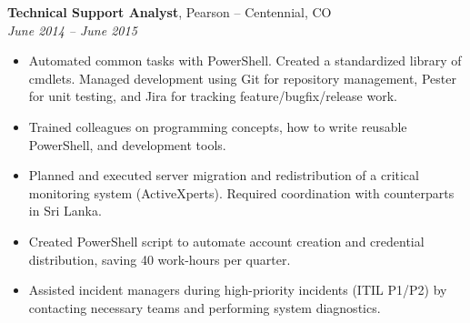 {\bf Technical Support Analyst}, Pearson – Centennial, CO\\
{\it June 2014 – June 2015}
\begin{itemize}
	\item Automated common tasks with PowerShell. Created a standardized library of cmdlets. Managed development using Git for repository management, Pester for unit testing, and Jira for tracking feature/bugfix/release work.
	\item Trained colleagues on programming concepts, how to write reusable PowerShell, and development tools.
	\item Planned and executed server migration and redistribution of a critical monitoring system (ActiveXperts). Required coordination with counterparts in Sri Lanka.
	\item Created PowerShell script to automate account creation and credential distribution, saving 40 work-hours per quarter.
	\item Assisted incident managers during high-priority incidents (ITIL P1/P2) by contacting necessary teams and performing system diagnostics.
\end{itemize}